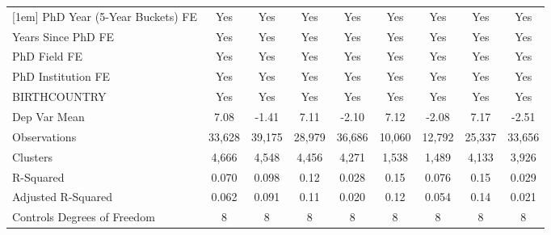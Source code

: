 \begin{table}[htbp]
\begin{tabular}{l*{8}{c}}
[1em]
PhD Year (5-Year Buckets) FE&         Yes         &         Yes         &         Yes         &         Yes         &         Yes         &         Yes         &         Yes         &         Yes         \\
[1em]
Years Since PhD FE&         Yes         &         Yes         &         Yes         &         Yes         &         Yes         &         Yes         &         Yes         &         Yes         \\
[1em]
PhD Field FE&         Yes         &         Yes         &         Yes         &         Yes         &         Yes         &         Yes         &         Yes         &         Yes         \\
[1em]
PhD Institution FE&         Yes         &         Yes         &         Yes         &         Yes         &         Yes         &         Yes         &         Yes         &         Yes         \\
[1em]
BIRTHCOUNTRY&         Yes         &         Yes         &         Yes         &         Yes         &         Yes         &         Yes         &         Yes         &         Yes         \\
\hline
Dep Var Mean&        7.08         &       -1.41         &        7.11         &       -2.10         &        7.12         &       -2.08         &        7.17         &       -2.51         \\
Observations&      33,628         &      39,175         &      28,979         &      36,686         &      10,060         &      12,792         &      25,337         &      33,656         \\
Clusters&       4,666         &       4,548         &       4,456         &       4,271         &       1,538         &       1,489         &       4,133         &       3,926         \\
R-Squared&       0.070         &       0.098         &        0.12         &       0.028         &        0.15         &       0.076         &        0.15         &       0.029         \\
Adjusted R-Squared&       0.062         &       0.091         &        0.11         &       0.020         &        0.12         &       0.054         &        0.14         &       0.021         \\
Controls Degrees of Freedom&           8         &           8         &           8         &           8         &           8         &           8         &           8         &           8         \\

\end{tabular}
\end{table}

